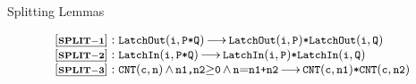 \begin{frame}[shrink=17]{Splitting Lemmas}

\begin{small}
\[
\begin{array}{l}
\BSPEC{\splitrulen{1}:
\LatchOut{i}{P{\sep}Q} \,{\longrightarrow}\, \LatchOut{i}{P} {\sep}\LatchOut{i}{Q}}
\\
\BSPEC{\splitrulen{2}:
\LatchIn{i}{P{\sep}Q} \,{\longrightarrow}\, \LatchIn{i}{P} {\sep}\LatchIn{i}{Q}}
\\
\BSPEC{\splitrulen{3}:
\CNT{c}{n} \,{\wedge}\, %
\code{n1,n2}{\geq}\code{0}  \, {\wedge}\, \code{n}{=}\code{n1{+}n2} 
\,{\longrightarrow}\,
\CNT{c}{n1} {\sep} \CNT{c}{n2} }
\end{array}
\]
\end{small}


\end{frame}
